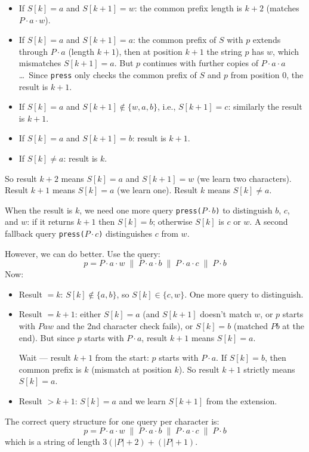 \documentclass[11pt,a4paper]{article}
\begin{document}
\begin{itemize}
  \item If $S[k] = a$ and $S[k+1] = w$: the common prefix length is $k+2$ (matches $P \cdot a \cdot w$).
  \item If $S[k] = a$ and $S[k+1] = a$: the common prefix of $S$ with $p$ extends through $P \cdot a$ (length $k+1$), then at position $k+1$ the string $p$ has $w$, which mismatches $S[k+1]=a$. But $p$ continues with further copies of $P \cdot a \cdot a$\ldots\ Since \texttt{press} only checks the common prefix of $S$ and $p$ from position 0, the result is $k+1$.
  \item If $S[k] = a$ and $S[k+1] \notin \{w, a, b\}$, i.e., $S[k+1] = c$: similarly the result is $k+1$.
  \item If $S[k] = a$ and $S[k+1] = b$: result is $k+1$.
  \item If $S[k] \ne a$: result is $k$.
\end{itemize}

So result $k+2$ means $S[k] = a$ and $S[k+1] = w$ (we learn two characters). Result $k+1$ means $S[k] = a$ (we learn one). Result $k$ means $S[k] \ne a$.

When the result is $k$, we need one more query \texttt{press($P \cdot b$)} to distinguish $b$, $c$, and $w$: if it returns $k+1$ then $S[k] = b$; otherwise $S[k]$ is $c$ or $w$. A second fallback query \texttt{press($P \cdot c$)} distinguishes $c$ from $w$.

However, we can do better. Use the query:
\[
  p = P \cdot a \cdot w \;\|\; P \cdot a \cdot b \;\|\; P \cdot a \cdot c \;\|\; P \cdot b
\]
Now:
\begin{itemize}
  \item Result $= k$: $S[k] \notin \{a, b\}$, so $S[k] \in \{c, w\}$. One more query to distinguish.
  \item Result $= k+1$: either $S[k] = a$ (and $S[k+1]$ doesn't match $w$, or $p$ starts with $Paw$ and the 2nd character check fails), or $S[k] = b$ (matched $Pb$ at the end). But since $p$ starts with $P \cdot a$, result $k+1$ means $S[k] = a$.

    Wait --- result $k+1$ from the start: $p$ starts with $P \cdot a$. If $S[k] = b$, then common prefix is $k$ (mismatch at position $k$). So result $k+1$ strictly means $S[k] = a$.
  \item Result $> k+1$: $S[k] = a$ and we learn $S[k+1]$ from the extension.
\end{itemize}

The correct query structure for one query per character is:
\[
  p = P \cdot a \cdot w \;\|\; P \cdot a \cdot b \;\|\; P \cdot a \cdot c \;\|\; P \cdot b
\]
which is a string of length $3(|P|+2) + (|P|+1)$.
\end{document}
